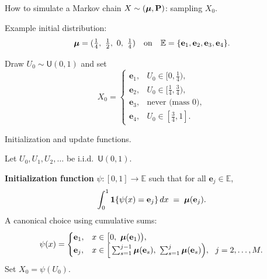\documentclass[aspectratio=169]{beamer}
\newcommand{\e}[0]{\textbf{e}}
\newcommand{\E}[0]{\mathbb{E}}
\begin{document}
\begin{frame}{How to simulate a Markov chain \(X\sim(\mbox{\boldmath $\mu$},\mathbf{P})\): sampling \(X_0\).}

Example initial distribution:
\[
\bfmu=(\tfrac14,\ \tfrac12,\ 0,\ \tfrac14)
\quad\text{on}\quad
\E=\{\e_1,\e_2,\e_3,\e_4\}.
\]

Draw \(U_0\sim \mathsf{U}(0,1)\) and set
\[
X_0=\begin{cases}
\e_1, & U_0\in[0,\tfrac14),\\
\e_2, & U_0\in[\tfrac14,\tfrac34),\\
\e_3, & \text{never (mass \(0\))},\\
\e_4, & U_0\in[\tfrac34,1].
\end{cases}
\]

\medskip
\centering
{}

\end{frame}
\begin{frame}{Initialization and update functions.}

Let \(U_0,U_1,U_2,\ldots\) be i.i.d.\ \(\mathsf{U}(0,1)\).

\textbf{Initialization function} \(\psi:[0,1]\to\E\) such that for all \(\e_j\in\E\),
\[
\int_0^1 \mathbf{1}\{\psi(x)=\e_j\}\,dx \;=\; \bfmu(\e_j).
\]
A canonical choice using cumulative sums:
\[
\psi(x)=
\begin{cases}
\e_1, & x\in\big[0,\ \bfmu(\e_1)\big),\\
\e_j, & x\in\Big[\sum_{s=1}^{j-1}\bfmu(\e_s),\ \sum_{s=1}^{j}\bfmu(\e_s)\Big),\ \ j=2,\ldots,M.
\end{cases}
\]
Set \(X_0=\psi(U_0)\).

\end{frame}
\end{document}
